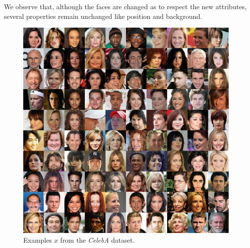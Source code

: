 \documentclass{article}
\begin{document}
We observe that, although the faces are changed as to respect the new attributes, several properties remain unchanged like position and background.

\begin{figure}[H]
\vspace{80pt}
    \centering \includegraphics[width=1.\textwidth]{celebattr_examples.png}
    \caption{Examples $x$ from the \emph{CelebA} dataset.}
    \label{fig:transfer-original}
\end{figure}
\end{document}
